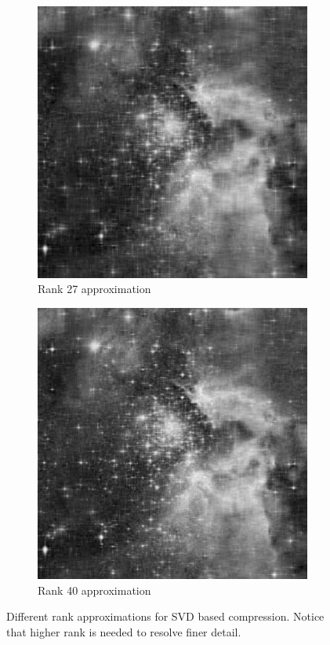 \begin{figure}
\begin{subfigure}[b]{.49\textwidth}
\centering
\includegraphics[width=\textwidth]{rank27.jpg}
\caption{Rank 27 approximation}
\end{subfigure}
\begin{subfigure}[b]{.49\textwidth}
\centering
\includegraphics[width=\textwidth]{rank40.jpg}
\caption{Rank 40 approximation}
\end{subfigure}
\caption{Different rank approximations for SVD based compression.  Notice that higher rank is needed to resolve finer detail.}
\label{fig:rankvalues}
\end{figure}

